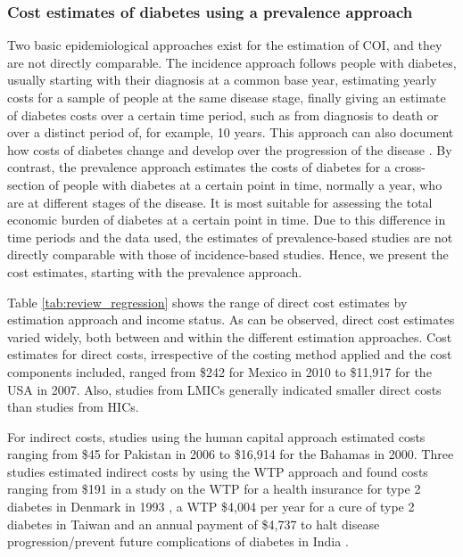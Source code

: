 \subsubsection{Cost estimates of diabetes using a prevalence approach}

Two basic epidemiological approaches exist for the estimation of \ac{COI}, and they  are not directly comparable. The incidence approach follows people with diabetes, usually starting with their diagnosis at a common base year, estimating yearly costs for a sample of people at the same disease stage, finally giving an estimate of diabetes costs over a certain time period, such as from diagnosis to death or over a distinct period of, for example, 10 years. This approach can also document how costs of diabetes change and develop over the progression of the disease \parencite{Larg2011}. By contrast, the prevalence approach estimates the costs of diabetes for a cross-section of people with diabetes at a certain point in time, normally a year, who are at different stages of the disease. It is most suitable for assessing the total economic burden of diabetes at a certain point in time. Due to this difference in time periods and the data used, the estimates of prevalence-based studies are not directly comparable with those of incidence-based studies. Hence, we present the cost estimates, starting with the prevalence approach.

Table \ref{tab:review_regression} shows the range of direct cost estimates by estimation approach and income status.  As can be observed, direct cost estimates varied widely, both between and within the different estimation approaches. Cost estimates for direct costs, irrespective of the costing method applied and the cost components included, ranged from \$242 for Mexico \parencite{Arredondo2005a} in 2010 to \$11,917 for the USA \parencite{Condliffe2014} in 2007. Also, studies from \acp{LMIC} generally indicated smaller direct costs than studies from \acp{HIC}.

For indirect costs, studies using the human capital approach estimated costs ranging from \$45 for Pakistan \parencite{Khowaja2007a} in 2006 to \$16,914 for the Bahamas \parencite{Barcelo2003} in 2000. Three studies estimated indirect costs by using the \ac{WTP} approach and found costs ranging from \$191 in a study on the \ac{WTP} for a health insurance for type 2 diabetes in Denmark in 1993 \parencite{Gyldmark2001}, a \ac{WTP} \$4,004 per year for a cure of type 2 diabetes \parencite{Chang2010b} in Taiwan  and an annual payment of \$4,737 to halt disease progression/prevent future complications of diabetes in India \parencite{Tharkar2010a}. 


